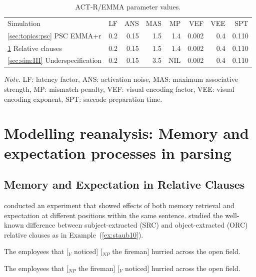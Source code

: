 \documentclass{cambridge7A}\usepackage[]{graphicx}\usepackage[]{color}
\begin{document}
\begin{table}[!htbp]
\begin{center}
\begin{threeparttable}
  \begin{tabular}{lrrrrrrr}
  Simulation & LF & ANS & MAS & MP & VEF & VEE & SPT \\
  \ref{sec:topics:psc} PSC EMMA+r & 0.2 & 0.15 & 1.5 & 1.4 & 0.002 & 0.4 & 0.110 \\
  \ref{sec:sim:II} Relative clauses & 0.2 & 0.15 & 1.5 & 1.4 & 0.002 & 0.4 & 0.110 \\
  \ref{sec:sim:III} Underspecification & 0.2 & 0.15 & 3.5 & NIL & 0.002 & 0.4 & 0.110 \\
  \end{tabular}
  \begin{tablenotes}
    \item \emph{Note.} LF: latency factor, ANS: activation noise, MAS: maximum associative strength, MP: mismatch penalty, VEF: visual encoding factor, VEE: visual encoding exponent, SPT: saccade preparation time.
  \end{tablenotes}
\end{threeparttable}
\end{center}
  \caption{ACT-R/EMMA parameter values.}  \label{tab:params}
\end{table}

\section[Modelling reanalysis]{Modelling reanalysis: Memory and expectation processes in parsing}\label{sec:sim:II}
\subsection{Memory and Expectation in Relative Clauses}

\cite{Staub2010a} conducted an experiment that showed effects of both memory retrieval and expectation at different positions within the same sentence. \cite{Staub2010a} studied the well-known difference between  subject-extracted (SRC) and  object-extracted (ORC) relative clauses as in Example~(\ref{ex:staub10}).

\begin{exe}
\ex\label{ex:staub10}
\begin{xlist}
  \item The employees that [$_{V}$ noticed] [$_{NP}$ the fireman] hurried across the open field.
  \item The employees that [$_{NP}$ the fireman] [$_V$ noticed] hurried across the open field.
\end{xlist}
\end{exe}
\end{document}
